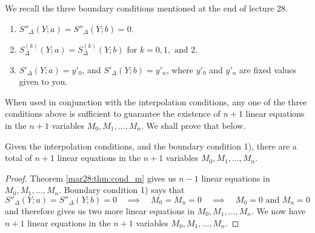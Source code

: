 We recall the three boundary conditions mentioned at the end of lecture 28.

\begin{enumerate}[label = \arabic*)]
\item
  $S''_\Delta(Y ; a) = S''_\Delta(Y ; b) = 0$.
\item
  $S^{(k)}_\Delta(Y ; a) = S^{(k)}_\Delta(Y ; b)$ for $k = 0, 1, \text{ and } 2$.
\item
  $S'_\Delta(Y ; a) = y'_0$, and $S'_\Delta(Y ; b) = y'_n$, where $y'_0$ and $y'_n$ are fixed values given to you.
\end{enumerate}

When used in conjunction with the interpolation conditions, any one of the three conditions above is sufficient to guarantee the existence of $n+1$ linear equations in the $n+1$ variables $M_0, M_1, \dots , M_n$. We shall prove that below.

\begin{thm}
  Given the interpolation conditions, and the boundary condition 1), there are a total of $n+1$ linear equations in the $n+1$ variables $M_0, M_1, \dots , M_n$.
\end{thm}
\begin{proof}
  Theorem \ref{mar28:thm:cond_m} gives us $n-1$ linear equations in $M_0, M_1, \dots , M_n$. Boundary condition 1) says that
  \[
    S''_\Delta(Y ; a) = S''_\Delta(Y ; b) = 0
    \quad \implies \quad
    M_0 = M_n = 0
    \quad \implies \quad
    M_0 = 0 \text{ and } M_n = 0
  \]
  and therefore gives us two more linear equations in $M_0, M_1, \dots , M_n$. We now have $n+1$ linear equations in the $n+1$ variables $M_0, M_1, \dots , M_n$.
\end{proof}

